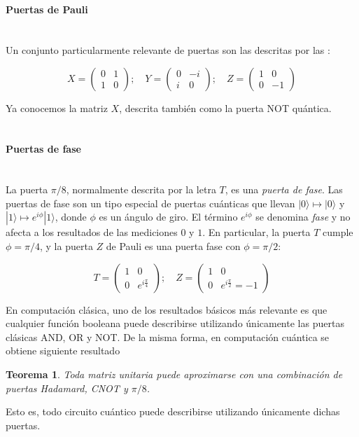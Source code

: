 \documentclass[11pt]{article}
\newcommand{\ra}{\rangle}
\newcommand{\myparagraph}[1]{\paragraph*{ \\ #1}\mbox{}\\}
\theoremstyle{plain}
\newtheorem*{theorem*}{Teorema}
\begin{document}
\myparagraph{Puertas de Pauli}


Un conjunto particularmente relevante de puertas son las descritas por las :

\[
X =
	\begin{pmatrix}
		0 & 1 \\
		1 & 0 
	\end{pmatrix}; \quad
	Y =
	\begin{pmatrix}
		0 & -i \\
		i & 0 
	\end{pmatrix}; \quad
	Z =
	\begin{pmatrix}
		1 & 0 \\
		0 & -1 
	\end{pmatrix}
\]

Ya conocemos la matriz $X$, descrita también como la puerta NOT quántica. \\


\myparagraph{Puertas de fase}


La puerta $\pi/8$, normalmente descrita por la letra $T$, es una \emph{puerta de fase}. Las puertas de fase son un tipo especial de puertas cuánticas que llevan $|0\ra \mapsto |0\ra$ y $|1\ra \mapsto e^{i\phi}|1\ra$, donde $\phi$ es un ángulo de giro. El término $e^{i\phi}$ se denomina \emph{fase} y no afecta a los resultados de las mediciones $0$ y $1$. En particular, la puerta $T$ cumple $\phi = \pi/4$, y la puerta $Z$ de Pauli es una puerta fase con $\phi = \pi/2$:

\[
	T =
	\begin{pmatrix}
		1 & 0 \\
		0 & e^{i\frac{\pi}{4}}
	\end{pmatrix}; \quad
	Z =
	\begin{pmatrix}
		1 & 0 \\
		0 & e^{i\frac{\pi}{2}} = -1
	\end{pmatrix}
\]

En computación clásica, uno de los resultados básicos más relevante es que cualquier función booleana puede describirse utilizando únicamente las puertas clásicas AND, OR y NOT. De la misma forma, en computación cuántica se obtiene siguiente resultado

\begin{theorem*}
	Toda matriz unitaria puede aproximarse con una combinación de puertas Hadamard, CNOT y $\pi/8$.
\end{theorem*}

Esto es, todo circuito cuántico puede describirse utilizando únicamente dichas puertas.
\end{document}
